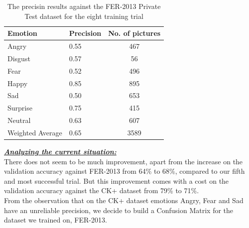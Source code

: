 \documentclass[runningheads,a4paper,11pt]{report}
\begin{document}
\begin{table}[htbp]
	\caption{The precisin results against the FER-2013 Private Test dataset for the eight training trial}
	\label{fer_training_28k_01_mean_square_augmented_x6_private_test}
		\begin{center}
			\begin{tabular}{p{110pt}p{110pt}c}
				\textbf{Emotion}& \textbf{Precision}& \textbf{No. of pictures} \\
				\hline\hline
				Angry& 0.55& 467 \\
				Disgust& 0.57& 56 \\
				Fear& 0.52& 496 \\
				Happy& 0.85& 895 \\
				Sad& 0.50& 653 \\
				Surprise& 0.75& 415 \\
				Neutral& 0.63& 607 \\
				\hline
				Weighted Average& 0.65 &3589
			\end{tabular}
		\end{center}
\end{table}

\clearpage
\underline{\textbf{\emph{Analyzing the current situation:}}}\\
There does not seem to be much improvement, apart from the increase on the validation accuracy against FER-2013 from 64\% to 68\%, compared to our fifth and most successful trial. But this improvement comes with a cost on the validation accuracy against the CK+ dataset from 79\% to 71\%.\\
From the observation that on the CK+ dataset emotions Angry, Fear and Sad have an unreliable precision, we decide to build a Confusion Matrix for the dataset we trained on, FER-2013.
\end{document}
